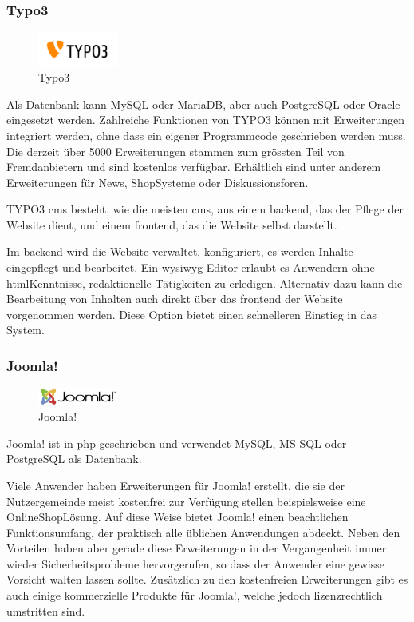 \documentclass[a4paper,11pt,twoside,titlepage,openright]{report}
\numberwithin{equation}{section}		%
\numberwithin{figure}{section}			%
\numberwithin{table}{section}				%
\begin{document}
\subsubsection{Typo3}

\begin{figure}
\centering
\includegraphics[width=100px]{Images/Typo3.png}
\caption{Typo3}
\end{figure}

Als Datenbank kann MySQL oder MariaDB, aber auch PostgreSQL oder Oracle eingesetzt werden. Zahlreiche Funktionen von TYPO3 können mit Erweiterungen integriert werden, ohne dass ein eigener Programmcode geschrieben werden muss. Die derzeit über 5000 Erweiterungen stammen zum grössten Teil von Fremdanbietern und sind kostenlos verfügbar. Erhältlich sind unter anderem Erweiterungen für News, Shop\textendash Systeme oder Diskussionsforen.

TYPO3 \acrshort{cms} besteht, wie die meisten \acrshort{cms}, aus einem \gls{backend}, das der Pflege der Website dient, und einem \gls{frontend}, das die Website selbst darstellt.

Im \gls{backend} wird die Website verwaltet, konfiguriert, es werden Inhalte eingepflegt und bearbeitet. Ein \acrshort{wysiwyg}-Editor erlaubt es Anwendern ohne \acrshort{html}\textendash Kenntnisse, redaktionelle Tätigkeiten zu erledigen. Alternativ dazu kann die Bearbeitung von Inhalten auch direkt über das \gls{frontend} der Website vorgenommen werden. Diese Option bietet einen schnelleren Einstieg in das System.

\subsubsection{Joomla!}

\begin{figure}
\centering
\includegraphics[width=100px]{Images/Joomla.png}
\caption{Joomla!}
\end{figure}
Joomla! ist in \acrshort{php} geschrieben und verwendet MySQL, MS SQL oder PostgreSQL als Datenbank.

Viele Anwender haben Erweiterungen für Joomla! erstellt, die sie der Nutzergemeinde meist kostenfrei zur Verfügung stellen \textemdash beispielsweise eine Online\textendash Shop\textendash Lösung. Auf diese Weise bietet Joomla! einen beachtlichen Funktionsumfang, der praktisch alle üblichen Anwendungen abdeckt. Neben den Vorteilen haben aber gerade diese Erweiterungen in der Vergangenheit immer wieder Sicherheitsprobleme hervorgerufen, so dass der Anwender eine gewisse Vorsicht walten lassen sollte. Zusätzlich zu den kostenfreien Erweiterungen gibt es auch einige kommerzielle Produkte für Joomla!, welche jedoch lizenzrechtlich umstritten sind.
\end{document}
